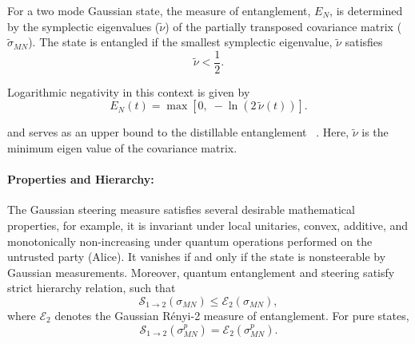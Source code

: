For a two mode Gaussian state, the measure of entanglement, $E_{N}$, 
is determined by the symplectic eigenvalues ($\tilde{\nu}$) of the partially transposed covariance matrix ($\tilde{\sigma}_{MN}$).
The state is entangled if the smallest symplectic eigenvalue, $\tilde{\nu}$ satisfies
\begin{equation}
	\tilde{\nu} < \frac{1}{2}.
\end{equation}

Logarithmic negativity in this context is given by
\begin{equation}
	E_{N}(t) = \max \left[ 0,\; -\ln \left( 2\,\tilde{\nu}(t) \right) \right].
\end{equation}

and serves as an upper bound to the distillable entanglement~\cite{VidalWerner2002,Plenio2005,Rai2010}
.
Here, $\tilde{\nu}$ is the minimum eigen value of the covariance matrix.

\paragraph{Properties and Hierarchy:}
The Gaussian steering measure satisfies several desirable mathematical properties, for example, it is invariant under local unitaries, convex, additive, and monotonically non-increasing under quantum operations performed on the untrusted party (Alice). It vanishes if and only if the state is nonsteerable by Gaussian measurements. Moreover, quantum entanglement and steering satisfy strict hierarchy relation, such that
\begin{equation}
	\mathcal{S}_{1 \rightarrow 2}(\sigma_{MN}) \leq \mathcal{E}_{2}(\sigma_{MN}),
\end{equation}
where $\mathcal{E}_{2}$ denotes the Gaussian Rényi-2 measure of entanglement.  
For pure states,
\begin{equation}
	\mathcal{S}_{1 \rightarrow 2}(\sigma_{MN}^{p}) = \mathcal{E}_{2}(\sigma_{MN}^{p}).
\end{equation}

